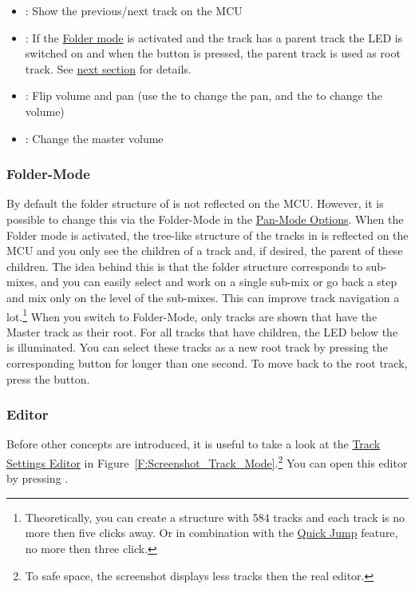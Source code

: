 \begin{itemize}
\item \channeldu: Show the previous/next track on the MCU

\item \gv: If the \hyperref[foldermode]{Folder mode} is activated and the
track has a parent track the LED is switched on and when the button is pressed,
the parent track is used as root track. See \hyperref[foldermode]{next
section} for details.

\item \flip: Flip volume and pan (use the \faders to change the pan, and the
\vpots to change the volume)

\item \mfader: Change the master volume
\end{itemize}

\noindent

\subsubsection{Folder-Mode}\label{foldermode}
By default the folder structure of \reaper is not reflected on the
MCU. However, it is possible to change this via the Folder-Mode
\attribute in the \hyperref[T:multitrack_options1]{Pan-Mode
  Options}. When the Folder mode is activated, the tree-like structure
of the tracks in \reaper is reflected on the MCU and you only see the
children of a track and, if desired, the parent of these children. The
idea behind this is that the folder structure corresponds to
sub-mixes, and you can easily select and work on a single sub-mix or
go back a step and mix only on the level of the sub-mixes. This can
improve track navigation a lot.\footnote{Theoretically, you can create a
  structure with 584 tracks and each track is no more then five clicks
  away. Or in combination with the \hyperref[quickjump]{Quick Jump}
  feature, no more then three click.} When you switch to Folder-Mode, only
tracks are shown that have the Master track as their root. For all
tracks that have children, the LED below the \vpot is illuminated. You can
select these tracks as a new root track by pressing the
corresponding \select button for longer than one second. To move back to
the root track, press the \gv button.

\subsubsection{Editor}\label{panmodeeditor}
Before other concepts are introduced, it is useful to take a look at the
\hyperref[F:Screenshot_Track_Mode]{Track Settings Editor} in
Figure~\ref{F:Screenshot_Track_Mode}.\footnote{To safe space, the screenshot
displays less tracks then the real editor.} You can open this editor by pressing
\alt \pan. 

